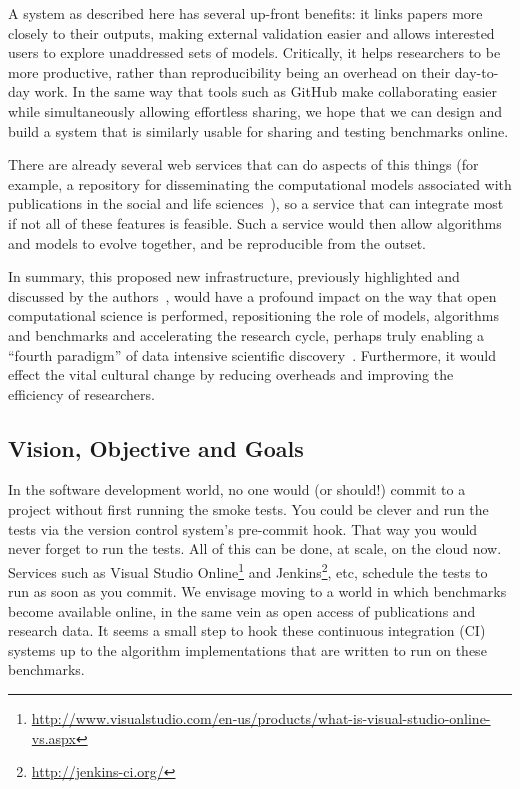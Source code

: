 \documentclass[a4paper,11pt]{article}
\begin{document}
A system as described here has several up-front benefits: it links
papers more closely to their outputs, making external validation
easier and allows interested users to explore unaddressed sets of
models. Critically, it helps researchers to be more productive, rather
than reproducibility being an overhead on their day-to-day work. In
the same way that tools such as GitHub make collaborating easier while
simultaneously allowing effortless sharing, we hope that we can design
and build a system that is similarly usable for sharing and testing
benchmarks online.

There are already several web services that can do aspects of this
things (for example, a repository for disseminating the computational
models associated with publications in the social and life
sciences~\cite{rollins-et-al:2014}), so a service that can integrate
most if not all of these features is feasible. Such a service would
then allow algorithms and models to evolve together, and be
reproducible from the outset.

In summary, this proposed new infrastructure, previously highlighted
and discussed by the
authors~\cite{crick-et-al_wssspe2,crick-et-al_recomp2014}, would have
a profound impact on the way that open computational science is
performed, repositioning the role of models, algorithms and benchmarks
and accelerating the research cycle, perhaps truly enabling a ``fourth
paradigm'' of data intensive scientific
discovery~\cite{hey:2009}. Furthermore, it would effect the vital
cultural change by reducing overheads and improving the efficiency of
researchers.

\subsection*{Vision, Objective and Goals}

In the software development world, no one would (or should!) commit to
a project without first running the smoke tests. You could be clever
and run the tests via the version control system's pre-commit
hook. That way you would never forget to run the tests. All of this
can be done, at scale, on the cloud now. Services such as Visual
Studio Online\footnote{\url{http://www.visualstudio.com/en-us/products/what-is-visual-studio-online-vs.aspx}}
and Jenkins\footnote{\url{http://jenkins-ci.org/}}, etc, schedule the
tests to run as soon as you commit. We envisage moving to a world in
which benchmarks become available online, in the same vein as open
access of publications and research data. It seems a small step to
hook these continuous integration (CI) systems up to the algorithm
implementations that are written to run on these benchmarks.
\end{document}
